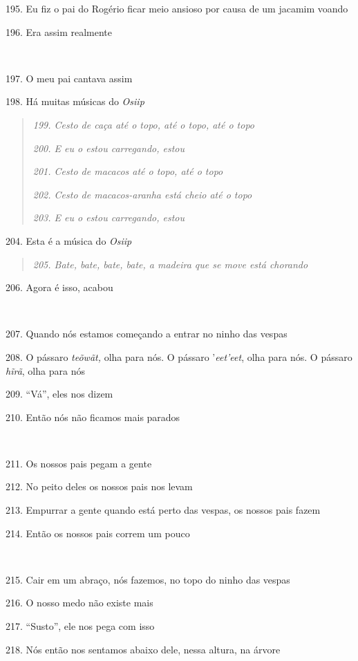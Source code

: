 195. Eu fiz o pai do Rogério ficar meio ansioso por causa de um jacamim
voando

196. Era assim realmente

~

197. O meu pai cantava assim

198. Há muitas músicas do \emph{Osiip}

\begin{quote}
\forceindent\emph{199. Cesto de caça até o topo, até o topo, até o topo}

\emph{200. E eu o estou carregando, estou }

\emph{201. Cesto de macacos até o topo, até o topo}

\emph{202. Cesto de macacos-aranha está cheio até o topo}

\emph{203. E eu o estou carregando, estou}
\end{quote}

204. Esta é a música do \emph{Osiip}

\begin{quote}
\forceindent\emph{205. Bate, bate, bate, bate, a madeira que se move está chorando}
\end{quote}

206. Agora é isso, acabou

~

207. Quando nós estamos começando a entrar no ninho das vespas

208. O pássaro \emph{teõwãt,} olha para nós. O pássaro '\emph{eet'eet},
olha para nós. O pássaro \emph{hĩrã}, olha para nós

209. ``Vá'', eles nos dizem

210. Então nós não ficamos mais parados

~

211. Os nossos pais pegam a gente

212. No peito deles os nossos pais nos levam

213. Empurrar a gente quando está perto das vespas, os nossos pais fazem

214. Então os nossos pais correm um pouco

~

215. Cair em um abraço, nós fazemos, no topo do ninho das vespas

216. O nosso medo não existe mais

217. ``Susto'', ele nos pega com isso

218. Nós então nos sentamos abaixo dele, nessa altura, na árvore

